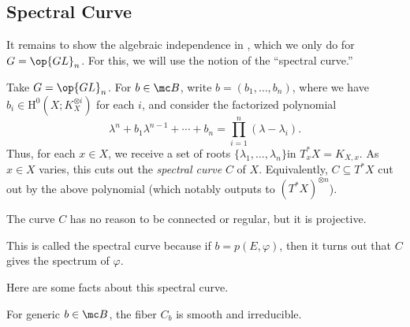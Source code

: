 \documentclass[../notes.tex]{subfiles}
\begin{document}
\subsection{Spectral Curve}
It remains to show the algebraic independence in , which we only do for $G=\op{GL}_n$. For this, we will use the notion of the ``spectral curve.''
\begin{definition}
	Take $G=\op{GL}_n$. For $b\in\mc B$, write $b=(b_1,\ldots,b_n)$, where we have $b_i\in\mathrm H^0(X;K_X^{\otimes i})$ for each $i$, and consider the factorized polynomial
	\[\lambda^n+b_1\lambda^{n-1}+\cdots+b_n=\prod_{i=1}^n(\lambda-\lambda_i).\]
	Thus, for each $x\in X$, we receive a set of roots $\{\lambda_1,\ldots,\lambda_n\}$in $T_x^*X=K_{X,x}$. As $x\in X$ varies, this cuts out the \textit{spectral curve} $C$ of $X$. Equivalently, $C\subseteq T^*X$ cut out by the above polynomial (which notably outputs to $(T^*X)^{\otimes n}$).
\end{definition}
\begin{remark}
	The curve $C$ has no reason to be connected or regular, but it is projective.
\end{remark}
\begin{remark}
	This is called the spectral curve because if $b=p(E,\varphi)$, then it turns out that $C$ gives the spectrum of $\varphi$.
\end{remark}
Here are some facts about this spectral curve.
\begin{theorem}[Hitchin]
	For generic $b\in\mc B$, the fiber $C_b$ is smooth and irreducible.
\end{theorem}
\end{document}

